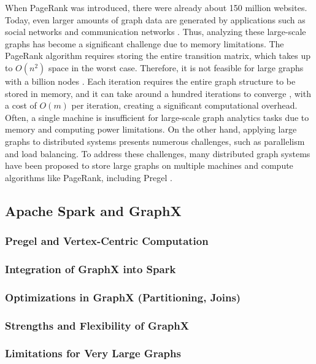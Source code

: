 When PageRank was introduced, there were already about 150 million websites. Today, even larger amounts of graph data are generated by applications such as social networks and communication networks \cite{gebreegziabher_chapter_2023}. Thus, analyzing these large-scale graphs has become a significant challenge due to memory limitations. The PageRank algorithm requires storing the entire transition matrix, which takes up to $O(n^2)$ space in the worst case. Therefore, it is not feasible for large graphs with a billion nodes \cite{wu_efficient_2024}. Each iteration requires the entire graph structure to be stored in memory, and it can take around a hundred iterations to converge \cite{langville_googles_2012}, with a cost of $O(m)$ per iteration, creating a significant computational overhead. Often, a single machine is insufficient for large-scale graph analytics tasks due to memory and computing power limitations. On the other hand, applying large graphs to distributed systems presents numerous challenges, such as parallelism and load balancing. To address these challenges, many distributed graph systems have been proposed to store large graphs on multiple machines and compute algorithms like PageRank, including Pregel \cite{meng_survey_2024}.



\subsection{Apache Spark and GraphX}

\subsubsection{Pregel and Vertex-Centric Computation}
\subsubsection{Integration of GraphX into Spark}
\subsubsection{Optimizations in GraphX (Partitioning, Joins)}
\subsubsection{Strengths and Flexibility of GraphX}
\subsubsection{Limitations for Very Large Graphs}

